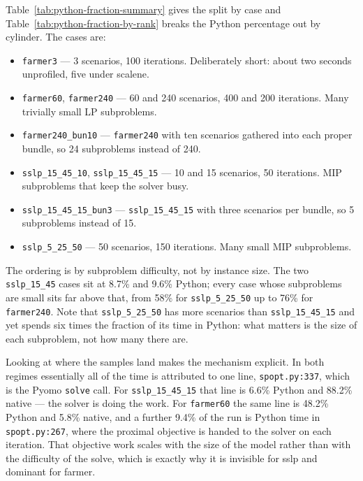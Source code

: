 \documentclass{article}
\begin{document}
Table~\ref{tab:python-fraction-summary} gives the split by case and
Table~\ref{tab:python-fraction-by-rank} breaks the Python percentage
out by cylinder. The cases are:

\begin{itemize}
  \item \texttt{farmer3} --- 3 scenarios, 100 iterations. Deliberately
    short: about two seconds unprofiled, five under scalene.
  \item \texttt{farmer60}, \texttt{farmer240} --- 60 and 240
    scenarios, 400 and 200 iterations. Many trivially small LP
    subproblems.
  \item \texttt{farmer240\_bun10} --- \texttt{farmer240} with ten
    scenarios gathered into each proper bundle, so 24 subproblems
    instead of 240.
  \item \texttt{sslp\_15\_45\_10}, \texttt{sslp\_15\_45\_15} --- 10 and
    15 scenarios, 50 iterations. MIP subproblems that keep the solver
    busy.
  \item \texttt{sslp\_15\_45\_15\_bun3} ---
    \texttt{sslp\_15\_45\_15} with three scenarios per bundle, so 5
    subproblems instead of 15.
  \item \texttt{sslp\_5\_25\_50} --- 50 scenarios, 150 iterations. Many
    small MIP subproblems.
\end{itemize}



The ordering is by subproblem difficulty, not by instance size. The two
\texttt{sslp\_15\_45} cases sit at 8.7\% and 9.6\% Python; every case
whose subproblems are small sits far above that, from 58\% for
\texttt{sslp\_5\_25\_50} up to 76\% for \texttt{farmer240}. Note that
\texttt{sslp\_5\_25\_50} has more scenarios than
\texttt{sslp\_15\_45\_15} and yet spends six times the fraction of its
time in Python: what matters is the size of each subproblem, not how
many there are.

Looking at where the samples land makes the mechanism explicit. In both
regimes essentially all of the time is attributed to one line,
\texttt{spopt.py:337}, which is the Pyomo \texttt{solve} call. For
\texttt{sslp\_15\_45\_15} that line is 6.6\% Python and 88.2\% native
--- the solver is doing the work. For \texttt{farmer60} the same line
is 48.2\% Python and 5.8\% native, and a further 9.4\% of the run is
Python time in \texttt{spopt.py:267}, where the proximal objective is
handed to the solver on each iteration. That objective work scales with
the size of the model rather than with the difficulty of the solve,
which is exactly why it is invisible for sslp and dominant for farmer.
\end{document}
